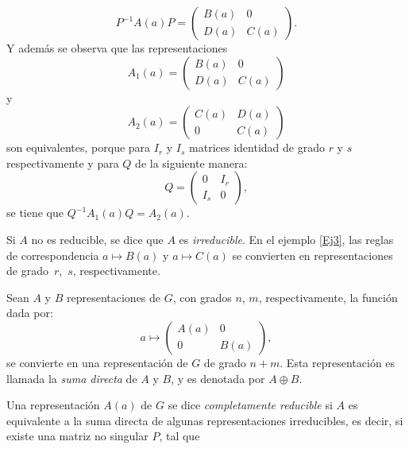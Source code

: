 \documentclass[12pt]{book}
\theoremstyle{definition}
\newcounter{in}
\begin{document}
\begin{equation*}
  P^{-1}A\left(a\right)P=
  \begin{pmatrix}
    B\left(a\right) & 0 \\
    D\left(a\right) & C\left(a\right)
  \end{pmatrix}. 
\end{equation*}  
Y además se observa que las representaciones
\begin{equation*}
  A_{1}\left(a\right)=
  \begin{pmatrix}
    B\left(a\right) & 0 \\
    D\left(a\right) & C\left(a\right)
  \end{pmatrix}
\end{equation*}
y
\begin{equation*} 
   A_{2}\left(a\right)=
  \begin{pmatrix}
    C\left(a\right) & D\left(a\right) \\
    0 & C\left(a\right)
  \end{pmatrix}
\end{equation*}
son equivalentes, porque para $I_{r}$ y $I_{s}$ matrices identidad de
grado $r$ y $s$ respectivamente y para $Q$ de la siguiente manera:
\begin{equation*}
  Q=
  \begin{pmatrix}
    0 & I_{r} \\ 
    I_{s} & 0
  \end{pmatrix},
\end{equation*}
se tiene que $Q^{-1}A_{1}\left(a\right)Q=A_{2}\left(a\right)$.

Si $A$ no es reducible, se dice que $A$ es \emph{irreducible}. En el ejemplo
\ref{Ej3}, las reglas de correspondencia $a \mapsto B\left(a\right)$ y
$a \mapsto C\left(a\right)$ se convierten en representaciones de
grado~$r$,~$s$, respectivamente.

Sean $A$ y $B$ representaciones de $G$, con grados $n$, $m$,
respectivamente, la función dada por:
\begin{equation*}
  a\mapsto
  \begin{pmatrix}
    A\left(a\right) & 0 \\ 
    0 & B\left(a\right)
  \end{pmatrix}, 
\end{equation*}
se convierte en una representación de $G$ de grado $n+m$. Esta
representación es llamada la \emph{suma directa} de $A$ y
$B$, y es denotada por $A \oplus B$.

Una representación $A\left(a\right)$ de $G$ se dice \emph{completamente
reducible} si $A$ es equivalente a la suma directa de algunas
representaciones irreducibles, es decir, si existe una matriz no singular
$P$, tal que
\end{document}
